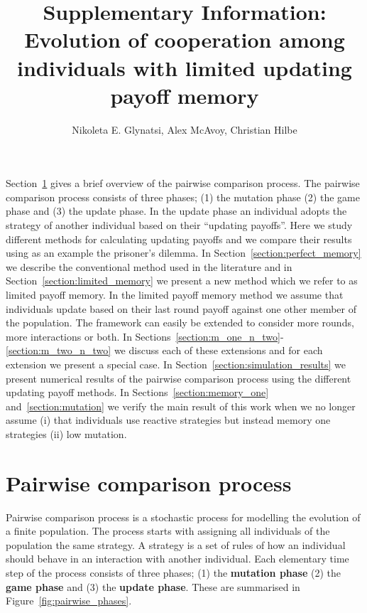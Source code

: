 \documentclass[11pt]{article}
\title{\bf  \sffamily \LARGE Supplementary Information: Evolution of cooperation among individuals with
limited updating payoff memory\\}
\date{}
\author{Nikoleta E. Glynatsi, Alex McAvoy, Christian Hilbe}
\theoremstyle{plainCl1}
\theoremstyle{plainCl2}
\begin{document}
\maketitle

Section~\ref{section:pairwise_comparison} gives a brief overview of the pairwise
comparison process. The pairwise comparison process consists of three phases;
(1) the mutation phase (2) the game phase and (3) the update phase. In the
update phase an individual adopts the strategy of another individual based on
their ``updating payoffs''. Here we study different methods for calculating
updating payoffs and we compare their results using as an example the prisoner's
dilemma. In Section~\ref{section:perfect_memory} we describe the conventional
method used in the literature and in Section~\ref{section:limited_memory} we
present a new method which we refer to as 
limited payoff memory. In the limited payoff memory method we assume that
individuals update based on their last round payoff against one other member of
the population. The framework can easily be extended to consider more rounds,
more interactions or both. In
Sections~\ref{section:m_one_n_two}-\ref{section:m_two_n_two} we discuss each of
these extensions and for each extension we present a special case.
In Section~\ref{section:simulation_results} we present numerical results of the
pairwise comparison process using the different updating payoff methods.
In Sections~\ref{section:memory_one} and~\ref{section:mutation} we
verify the main result of this work when we no longer assume (i) that
individuals use reactive strategies but instead memory one strategies (ii) low
mutation.

\section{Pairwise comparison process}\label{section:pairwise_comparison}

Pairwise comparison process is a stochastic process for modelling the evolution
of a finite population. The process starts with assigning all individuals of the
population the same strategy. A strategy is a set of rules of how an individual
should behave in an interaction with another individual. Each elementary time
step of the process consists of three phases; (1) the \textbf{mutation phase}
(2) the \textbf{game phase} and (3) the \textbf{update phase}. These are summarised
in Figure~\ref{fig:pairwise_phases}.
\end{document}
